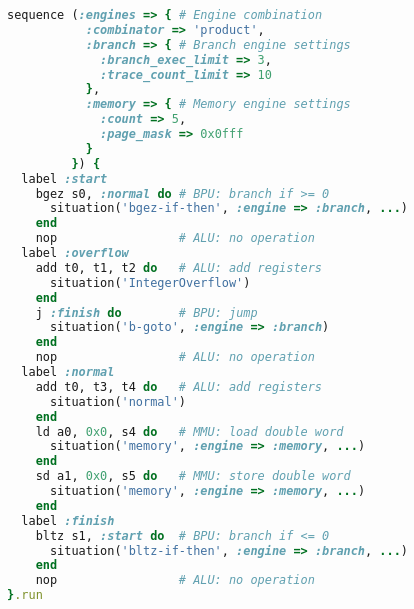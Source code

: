 \begin{lstlisting}[language=ruby, emph={sequence,
                                        situation,
                                        engines,
                                        combinator,
                                        branch,
                                        branch_exec_limit,
                                        trace_count_limit,
                                        memory,
                                        classifier,
                                        page_mask,
                                        align,
                                        count,
                                        engine,
                                        stream,
                                        base,
                                        start,
                                        finish,
                                        normal,
                                        overflow,
                                        run
                                        }]
sequence (:engines => { # Engine combination
           :combinator => 'product',
           :branch => { # Branch engine settings
             :branch_exec_limit => 3,
             :trace_count_limit => 10
           },
           :memory => { # Memory engine settings
             :count => 5,
             :page_mask => 0x0fff
           }
         }) {
  label :start
    bgez s0, :normal do # BPU: branch if >= 0
      situation('bgez-if-then', :engine => :branch, ...)
    end
    nop                 # ALU: no operation
  label :overflow
    add t0, t1, t2 do   # ALU: add registers
      situation('IntegerOverflow')
    end
    j :finish do        # BPU: jump
      situation('b-goto', :engine => :branch)
    end
    nop                 # ALU: no operation
  label :normal
    add t0, t3, t4 do   # ALU: add registers
      situation('normal')
    end
    ld a0, 0x0, s4 do   # MMU: load double word
      situation('memory', :engine => :memory, ...)
    end
    sd a1, 0x0, s5 do   # MMU: store double word
      situation('memory', :engine => :memory, ...)
    end
  label :finish
    bltz s1, :start do  # BPU: branch if <= 0
      situation('bltz-if-then', :engine => :branch, ...)
    end
    nop                 # ALU: no operation
}.run
\end{lstlisting}
\vspace*{-0.1in}

